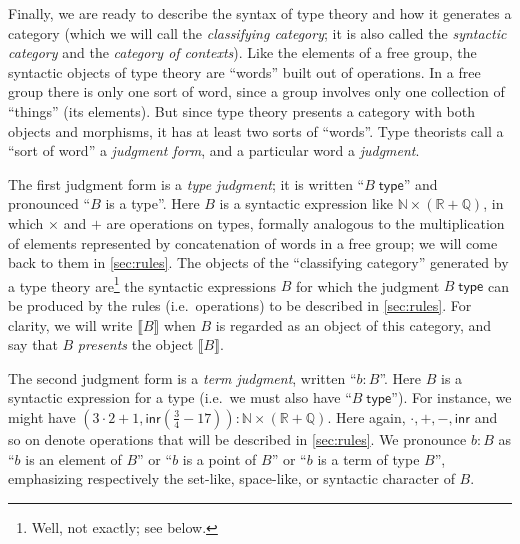 \documentclass[12pt]{article}
\def\oo{\ensuremath{\infty}}
\def\ty{\;\mathsf{type}}
\def\m#1{\llbracket#1\rrbracket}
\def\N{\mathbb{N}}
\def\Q{\mathbb{Q}}
\def\R{\mathbb{R}}
\numberwithin{equation}{section}
\begin{document}
Finally, we are ready to describe the syntax of type theory and how it generates a category (which we will call the \emph{classifying category}; it is also called the \emph{syntactic category} and the \emph{category of contexts}).
Like the elements of a free group, the syntactic objects of type theory are ``words'' built out of operations.
In a free group there is only one sort of word, since a group involves only one collection of ``things'' (its elements).
But since type theory presents a category with both objects and morphisms, %
it has at least two sorts of ``words''.
Type theorists call a ``sort of word'' a \emph{judgment form}, and a particular word a \emph{judgment}.

The first judgment form is a \emph{type judgment}; it is written ``$B\ty$'' and pronounced ``$B$ is a type''.
Here $B$ is a syntactic expression like $\N\times (\R+\Q)$, %
in which $\times$ and $+$ are operations on types, formally analogous to the multiplication of elements represented by concatenation of words in a free group; we will come back to them in \cref{sec:rules}.
The objects of the ``classifying category'' generated by a type theory are\footnote{Well, not exactly; see below.} the syntactic expressions $B$ for which the judgment $B\ty$ can be produced by the rules (i.e.\ operations) to be described in \cref{sec:rules}.
For clarity, we will write $\m B$ when $B$ is regarded as an object of this category, and say that $B$ \emph{presents} the object $\m B$.

The second judgment form is a \emph{term judgment}, written ``$b:B$''.
Here $B$ is a syntactic expression for a type (i.e.\ we must also have ``$B\ty$'').
For instance, we might have $(3\cdot 2+1, \mathsf{inr}(\frac{3}{4}-17)) : \N\times (\R+\Q)$.%
Here again, $\cdot,+,-,\mathsf{inr}$ and so on denote operations that will be described in \cref{sec:rules}.
We pronounce $b:B$ as ``$b$ is an element of $B$'' or ``$b$ is a point of $B$'' or ``$b$ is a term of type $B$'', emphasizing respectively the set-like, space-like, or syntactic character of $B$.
\end{document}
